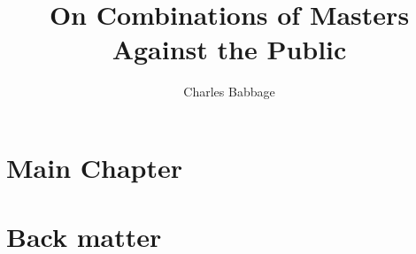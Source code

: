 \documentclass[11pt]{book}
\title{On Combinations of Masters Against the Public}
\author{Charles Babbage}
\begin{document}
\maketitle
\def\title#1{\chapter{#1}}
\tableofcontents

\part{Main Chapter}
        
        
        
        
\part{Back matter}
        
        
        
        
\end{document}
